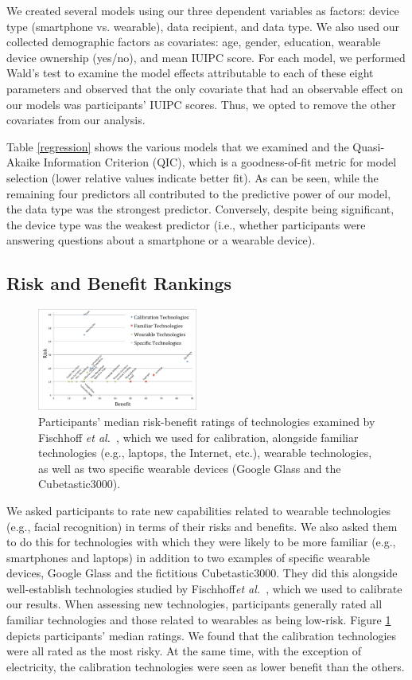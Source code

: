 \documentclass{acm_proc_article-sp}
\def\etal{{\it et al.~}}
\begin{document}
We created several models using our three dependent variables as factors: device type (smartphone vs. wearable), data recipient, and data type. We also used our collected demographic factors as covariates: age, gender, education, wearable device ownership (yes/no), and mean IUIPC score. For each model, we performed Wald's test to examine the model effects attributable to each of these eight parameters and observed that the only covariate that had an observable effect on our models was participants' IUIPC scores. Thus, we opted to remove the other covariates from our analysis.

Table \ref{regression} shows the various models that we examined and the Quasi-Akaike Information Criterion (QIC), which is a goodness-of-fit metric for model selection (lower relative values indicate better fit). As can be seen, while the remaining four predictors all contributed to the predictive power of our model, the data type was the strongest predictor. Conversely, despite being significant, the device type was the weakest predictor (i.e., whether participants were answering questions about a smartphone or a wearable device).


\subsection{Risk and Benefit Rankings} 
\begin{figure}[t]
	\centering
	\includegraphics[width=0.47\textwidth]{riskbenefit.pdf}
	\caption{Participants' median risk-benefit ratings of technologies examined by Fischhoff \etal\cite{Fischhoff}, which we used for calibration, alongside familiar technologies (e.g., laptops, the Internet, etc.), wearable technologies, as well as two specific wearable devices (Google Glass and the Cubetastic3000).}
	\label{fig:techplot}
\end{figure}

We asked participants to rate new capabilities related to wearable technologies (e.g., facial recognition) in terms of their risks and benefits. We also asked them to do this for technologies with which they were likely to be more familiar (e.g., smartphones and laptops) in addition to two examples of specific wearable devices, Google Glass and the fictitious Cubetastic3000. They did this alongside well-establish technologies studied by Fischhoff\etal\cite{Fischhoff}, which we used to calibrate our results. When assessing new technologies, participants generally rated all familiar technologies and those related to wearables as being low-risk. Figure \ref{fig:techplot} depicts participants' median ratings. We found that the calibration technologies were all rated as the most risky. At the same time, with the exception of electricity, the calibration technologies were seen as lower benefit than the others.
\end{document}
